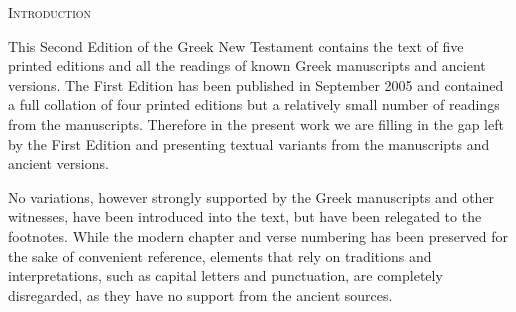 \pagestyle{fancy}
\thispagestyle{empty}
\begin{center}
\LARGE\scshape Introduction
\end{center}
\normalsize

This Second Edition of the Greek New Testament contains the text of 
five printed editions and all the readings of known Greek
manuscripts and ancient versions.
The First Edition has been published in September 2005 and
contained a full collation of four printed editions but a relatively small
number of readings from the manuscripts.
Therefore in the present work we are filling in the gap left by the
First Edition and presenting  textual variants from the
manuscripts and ancient versions.

No variations, however strongly supported by the Greek manuscripts
and other witnesses, have been introduced into the text, but have been
relegated to the footnotes.
While the modern chapter and verse numbering has been preserved for the sake of
convenient reference, elements that rely on traditions and interpretations,
such as capital letters and punctuation, are completely disregarded, as they
have no support from the ancient sources.

